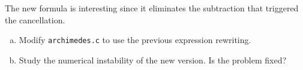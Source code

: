 The new formula is interesting since it eliminates the subtraction that triggered the cancellation.

\begin{question}
  \begin{enumerate}[(a)]
    \item Modify \texttt{archimedes.c} to use the previous expression rewriting.
    \item Study the numerical instability of the new version. Is the problem fixed?
  \end{enumerate}
\end{question}
